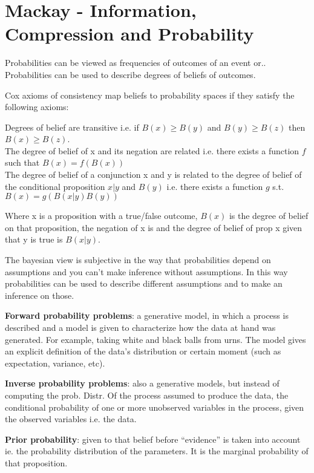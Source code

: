 \section{Mackay - Information, Compression and Probability}

Probabilities can be viewed  as frequencies of outcomes of an event or..\\
Probabilities can be used to describe degrees of beliefs of outcomes.

Cox axioms of consistency map beliefs to probability spaces if they satisfy the following axioms:

Degrees of belief are transitive i.e. if $B(x) \geq B(y)$ and $B(y) \geq B(z)$ then $B(x) \geq B(z)$. \\
The degree of belief of x and its negation  are related i.e. there exists a function $f$ such that $B(x) = f(B(x))$ \\
The degree of belief of a conjunction x and y is related to the degree of belief of the conditional proposition $x | y$ and $B(y)$ i.e. there exists a function $g$ s.t. $B(x) = g(B(x | y)B(y))$

Where x is a proposition with a true/false outcome, $B(x)$ is the degree of belief on that proposition, the negation of x is  and the degree of belief of prop x given that y is true is $B(x | y)$.

The bayesian view is subjective in the way that  probabilities depend on assumptions and you can’t make inference without assumptions.
In this way probabilities can be used to describe different assumptions and to make an inference on those. 

\textbf{Forward probability problems}: a generative model, in which a process is described and a model is given to characterize how the data at hand was generated. For example, taking white and black balls from urns. The model gives an explicit definition of the data’s distribution or certain moment (such as expectation, variance, etc).

\textbf{Inverse probability problems}: also a generative models, but instead of computing the prob. Distr. Of the process assumed to produce the data, the conditional probability of one or more unobserved variables in the process, given the observed variables i.e. the data.

\textbf{Prior probability}: given to that belief before “evidence” is taken into account ie. the probability distribution of the parameters. It is the marginal probability of that proposition. 

